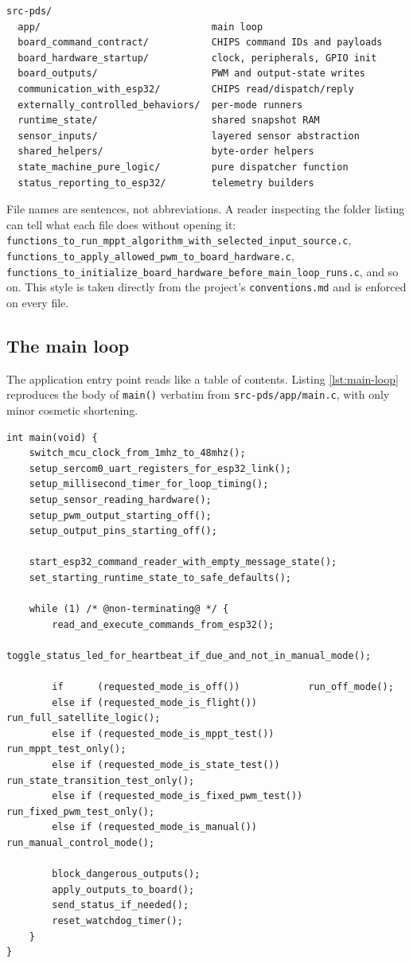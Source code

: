 \begin{lstlisting}
src-pds/
  app/                              main loop
  board_command_contract/           CHIPS command IDs and payloads
  board_hardware_startup/           clock, peripherals, GPIO init
  board_outputs/                    PWM and output-state writes
  communication_with_esp32/         CHIPS read/dispatch/reply
  externally_controlled_behaviors/  per-mode runners
  runtime_state/                    shared snapshot RAM
  sensor_inputs/                    layered sensor abstraction
  shared_helpers/                   byte-order helpers
  state_machine_pure_logic/         pure dispatcher function
  status_reporting_to_esp32/        telemetry builders
\end{lstlisting}

File names are sentences, not abbreviations. A reader inspecting
the folder listing can tell what each file does without opening it:
\texttt{functions\_to\_run\_mppt\_algorithm\_with\_selected\_input\_source.c},
\texttt{functions\_to\_apply\_allowed\_pwm\_to\_board\_hardware.c},
\texttt{functions\_to\_initialize\_board\_hardware\_before\_main\_loop\_runs.c},
and so on. This style is taken directly from the project's
\texttt{conventions.md} and is enforced on every file.

\subsection{The main loop}
\label{sec:main-loop}

The application entry point reads like a table of contents. Listing
\ref{lst:main-loop} reproduces the body of \texttt{main()} verbatim
from \texttt{src-pds/app/main.c}, with only minor cosmetic
shortening.

\begin{lstlisting}[caption={The main super-loop of the EPS firmware.},label={lst:main-loop}]
int main(void) {
    switch_mcu_clock_from_1mhz_to_48mhz();
    setup_sercom0_uart_registers_for_esp32_link();
    setup_millisecond_timer_for_loop_timing();
    setup_sensor_reading_hardware();
    setup_pwm_output_starting_off();
    setup_output_pins_starting_off();

    start_esp32_command_reader_with_empty_message_state();
    set_starting_runtime_state_to_safe_defaults();

    while (1) /* @non-terminating@ */ {
        read_and_execute_commands_from_esp32();
        toggle_status_led_for_heartbeat_if_due_and_not_in_manual_mode();

        if      (requested_mode_is_off())            run_off_mode();
        else if (requested_mode_is_flight())         run_full_satellite_logic();
        else if (requested_mode_is_mppt_test())      run_mppt_test_only();
        else if (requested_mode_is_state_test())     run_state_transition_test_only();
        else if (requested_mode_is_fixed_pwm_test()) run_fixed_pwm_test_only();
        else if (requested_mode_is_manual())         run_manual_control_mode();

        block_dangerous_outputs();
        apply_outputs_to_board();
        send_status_if_needed();
        reset_watchdog_timer();
    }
}
\end{lstlisting}

